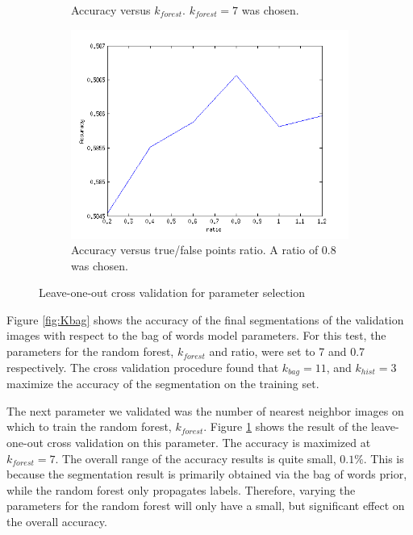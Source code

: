 \documentclass{article} %
\begin{document}
\begin{figure}[htb]
\begin{subfigure}[t]{0.33\textwidth}
		\parbox{0.95\textwidth}{\caption{Accuracy versus $k_{forest}$. $k_{forest} = 7$ was chosen. \label{fig:Kforest}}}
	\end{subfigure}
	\begin{subfigure}[t]{0.33\textwidth}
		\centering
		\includegraphics[width = \textwidth]{./img/ratio}
		\parbox{0.95\textwidth}{\caption{Accuracy versus true/false points ratio. A ratio  of 0.8 was chosen. \label{fig:ratio}}}
	\end{subfigure}
	\caption{Leave-one-out cross validation for parameter selection}
\end{figure}

Figure \ref{fig:Kbag} shows the accuracy of the final segmentations of the validation images with respect to the bag of words model parameters. 
For this test, the parameters for the random forest, $k_{forest}$ and ratio, were set to 7 and 0.7 respectively. 
The cross validation procedure found that $k_{bag} = 11$, and $k_{hist} = 3$ maximize the accuracy of the segmentation on the training set.

The next parameter we validated was the number of nearest neighbor images on which to train the random forest, $k_{forest}$. 
	Figure \ref{fig:Kforest} shows the result of the leave-one-out cross validation on this parameter. The accuracy is maximized at $k_{forest} = 7$. The overall range of the accuracy results is quite small, $0.1\%$. This is because the segmentation result is primarily obtained via the bag of words prior, while the random forest only propagates labels. Therefore, varying the parameters for the random forest will only have a small, but significant effect on the overall accuracy.
\end{document}
